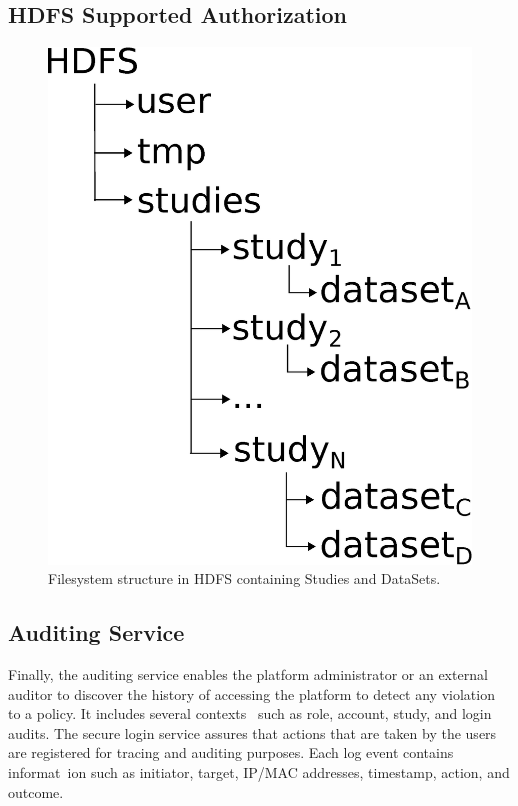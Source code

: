 \subsection{HDFS Supported Authorization}

\begin{figure}[h]
 \centering
 \includegraphics[scale=0.2]{./imgs/HDFS-structure.eps}
 \caption{Filesystem structure in HDFS containing Studies and DataSets.}
\end{figure}


\subsection {Auditing Service}
Finally, the auditing service enables the platform administrator or an external auditor to discover the history of accessing the platform to detect any violation to a policy. It includes several contexts \
such as role, account, study, and login audits. The secure login service assures that actions that are taken by the users are registered for tracing and auditing purposes. Each log event contains informat\
ion such as initiator, target, IP/MAC addresses, timestamp, action, and outcome.
